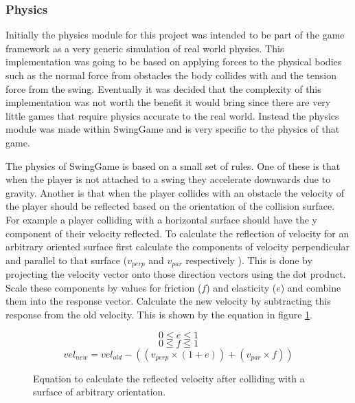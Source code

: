 \documentclass[]{report}
\begin{document}
			\subsubsection{Physics}
			Initially the physics module for this project was intended to be part of the game framework as a very generic simulation of real world physics. This implementation was going to be based on applying forces to the physical bodies such as the normal force from obstacles the body collides with and the tension force from the swing. Eventually it was decided that the complexity of this implementation was not worth the benefit it would bring since there are very little games that require physics accurate to the real world. Instead the physics module was made within SwingGame and is very specific to the physics of that game.
			
			The physics of SwingGame is based on a small set of rules. One of these is that when the player is not attached to a swing they accelerate downwards due to gravity. Another is that when the player collides with an obstacle the velocity of the player should be reflected based on the orientation of the collision surface. For example a player colliding with a horizontal surface should have the y component of their velocity reflected. To calculate the reflection of velocity for an arbitrary oriented surface first calculate the components of velocity perpendicular and parallel to that surface ($v_{perp}$ and $v_{par}$ respectively ). This is done by projecting the velocity vector onto those direction vectors using the dot product. Scale these components by values for friction ($f$) and elasticity ($e$) and combine them into the response vector. Calculate the new velocity by subtracting this response from the old velocity. This is shown by the equation in figure \ref{collisionResponse}.
			
			\begin{figure}[H]
				\centering
				\begin{displaymath}
					0 \leq e \leq 1
				\end{displaymath}
				\begin{displaymath}
					0 \leq f \leq 1
				\end{displaymath}
				\begin{displaymath}
					vel_{new} = vel_{old} - ((v_{perp} \times (1+e)) + (v_{par} \times f))
				\end{displaymath}
				\caption{Equation to calculate the reflected velocity after colliding with a surface of arbitrary orientation.}
				\label{collisionResponse}
			\end{figure}
			
\end{document}
